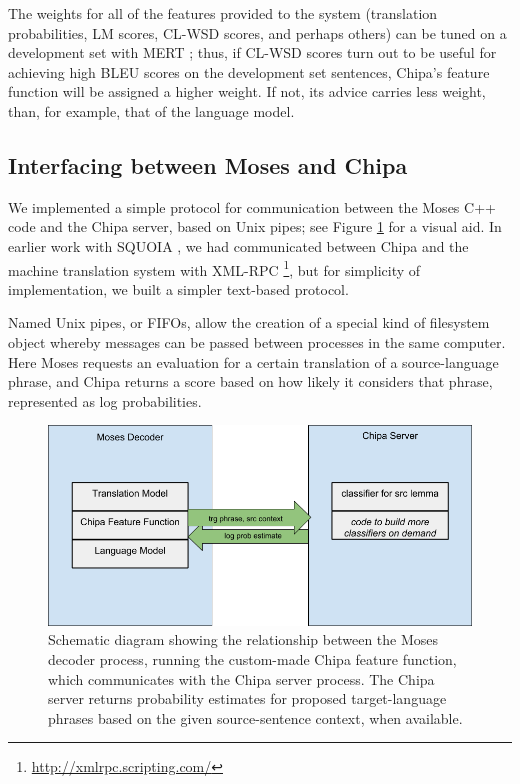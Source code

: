 The weights for all of the features provided to the system (translation
probabilities, LM scores, CL-WSD scores, and perhaps others) can be tuned on a
development set with MERT \cite{och:2003:ACL}; thus, if CL-WSD scores turn out
to be useful for achieving high BLEU scores on the development set sentences,
Chipa's feature function will be assigned a higher weight. If not, its advice
carries less weight, than, for example, that of the language model.


\subsection{Interfacing between Moses and Chipa}
We implemented a simple protocol for communication between the Moses C++ code
and the Chipa server, based on Unix pipes; see Figure
\ref{fig:moses-chipa-diagram} for a visual aid. In earlier work with SQUOIA
\cite{rudnick:saltmil2014}, we had communicated between Chipa and the machine
translation system with XML-RPC \footnote{\url{http://xmlrpc.scripting.com/}},
but for simplicity of implementation, we built a simpler text-based protocol.

Named Unix pipes, or FIFOs, allow the creation of a special kind of filesystem
object whereby messages can be passed between processes in the same computer.
Here Moses requests an evaluation for a certain translation of a
source-language phrase, and Chipa returns a score based on how likely it
considers that phrase, represented as log probabilities. 

\begin{figure}
  \begin{centering}
  \includegraphics[width=15cm]{moses-chipa-diagram.png}
  \end{centering}
  \caption{Schematic diagram showing the relationship between the Moses decoder
  process, running the custom-made Chipa feature function, which communicates
  with the Chipa server process. The Chipa server returns probability
  estimates for proposed target-language phrases based on the given
  source-sentence context, when available.}
  \label{fig:moses-chipa-diagram}
\end{figure}

